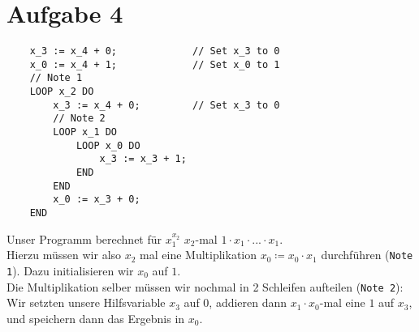 \documentclass[a4paper,11pt]{scrartcl}
\begin{document}
	\section*{Aufgabe 4}
	\begin{lstlisting}
	x_3 := x_4 + 0;				// Set x_3 to 0
	x_0 := x_4 + 1;				// Set x_0 to 1
	// Note 1
	LOOP x_2 DO
		x_3 := x_4 + 0; 		// Set x_3 to 0
		// Note 2	
		LOOP x_1 DO
			LOOP x_0 DO
				x_3 := x_3 + 1;
			END
		END
		x_0 := x_3 + 0;
	END
	\end{lstlisting}
	Unser Programm berechnet für $x_1^{x_2}$ $x_2$-mal $1 \cdot x_1 \cdot ... \cdot x_1$.\\
	Hierzu müssen wir also $x_2$ mal eine Multiplikation $x_0 \coloneqq x_0 \cdot x_1$ durchführen (\verb|Note 1|). Dazu initialisieren wir $x_0$ auf $1$.\\
	Die Multiplikation selber müssen wir nochmal in 2 Schleifen aufteilen (\verb|Note 2|): Wir setzten unsere Hilfsvariable $x_3$ auf $0$, addieren dann $x_1\cdot x_0$-mal eine $1$ auf $x_3$, und speichern dann das Ergebnis in $x_0$.
	
	
\end{document}
